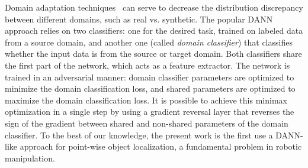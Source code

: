 \documentclass[letterpaper, 10 pt, conference]{ieeeconf}  %
\newcommand{\phil}[1]{\textcolor{blue}{#1}}
\begin{document}
Domain adaptation techniques~\cite{wang2018deep,csurka2017domain} can serve to decrease the distribution discrepancy between different domains, such as real vs. synthetic. The popular DANN~\cite{ganin2016domain} approach relies on two classifiers: one for the desired task, trained on labeled data from a source domain, and another one (called \emph{domain classifier}) that classifies whether the input data is from the source or target domain. Both classifiers share the first part of the network, which acts as a feature extractor. The network is trained in an adversarial manner: domain classifier parameters are optimized to minimize the domain classification loss, and shared parameters are optimized to maximize the domain classification loss. It is possible to achieve this minimax optimization in a single step by using a gradient reversal layer that reverses the sign of the gradient between shared and non-shared parameters of the domain classifier. To the best of our knowledge, the present work is the first use a DANN-like approach for point-wise object localization, a fundamental problem in robotic manipulation.
\end{document}
